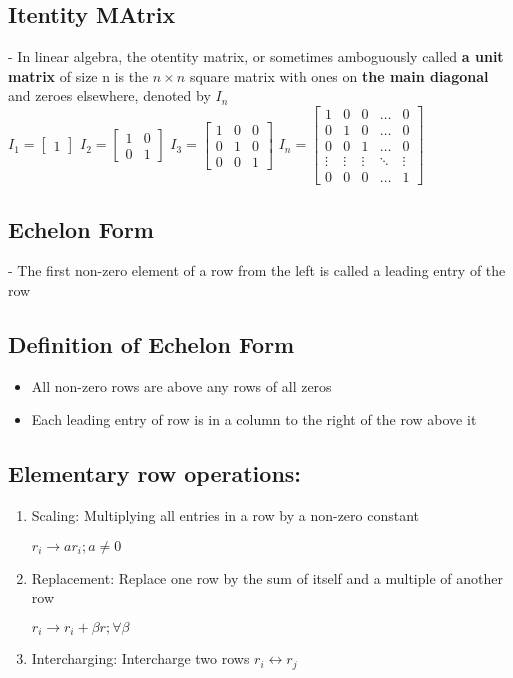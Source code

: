 \documentclass[12pt]{article}
\begin{document}
\subsection{Itentity MAtrix}
- In linear algebra, the otentity matrix, or sometimes amboguously called \textbf{a unit matrix} of size n is the $n \times n$ square matrix with ones on \textbf{the main diagonal} and zeroes elsewhere, denoted by $I_{n}$ \\
$I_{1} = 
\begin{bmatrix}
1
\end{bmatrix}$
\bigbreak
$I_{2} = 
\begin{bmatrix}
1 & 0 \\
0 & 1
\end{bmatrix}$
\bigbreak
$I_{3} = 
\begin{bmatrix}
1 & 0 & 0 \\
0 & 1 & 0 \\
0 & 0 & 1
\end{bmatrix}$
\bigbreak
$I_{n} = 
\begin{bmatrix}
1 & 0 & 0 & \ldots & 0 \\
0 & 1 & 0 & \ldots & 0 \\
0 & 0 & 1 & \ldots & 0 \\
\vdots & \vdots & \vdots & \ddots & \vdots \\
0 & 0 & 0 & \ldots & 1
\end{bmatrix}$
\subsection{Echelon Form}
- The first non-zero element of a row from the left is called a leading entry of the row
\subsection{Definition of Echelon Form}
\begin{itemize}
	\item All non-zero rows are above any rows of all zeros
	\item Each leading entry of row is in a column to the right of the row above it
\end{itemize}
\subsection{Elementary row operations:}
\begin{enumerate}
	\item Scaling: Multiplying all entries in a row by a non-zero constant
	\begin{center}
	$r_{i} \rightarrow ar_{i}; a \not = 0$
	\end{center}
	\item Replacement: Replace one row by the sum of itself and a multiple of another row
	\begin{center}
	$r_{i} \rightarrow r_{i} + \beta r; \forall \beta$
	\end{center}
	\item Intercharging: Intercharge two rows $r_{i} \leftrightarrow r_{j}$
\end{enumerate}
\end{document}
